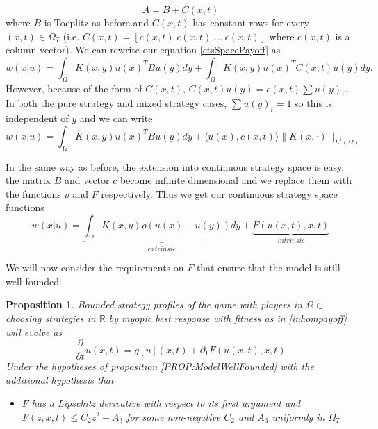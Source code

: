 \documentclass[aps,
preprint,
groupedaddress,
showkeys,
amsmath]{revtex4-2}
\newtheorem{proposition}{Proposition}
\DeclareMathOperator{\Rn}{\mathbb{R}^n}
\begin{document}
   \[A=B+C(x,t)\] 
    where $B$ is Toeplitz as before and $C(x,t)$ has constant rows for every $(x,t)\in \Omega_T$ (i.e. $C(x,t)=[c(x,t)\;c(x,t)\;\dots \;c(x,t)]$ where $c(x,t)$ is a column vector). We can rewrite our equation \eqref{ctsSpacePayoff} as
    \begin{equation*}
        w(x|u)=\int_\Omega K(x,y)u(x)^TBu(y)dy+\int_\Omega K(x,y)u(x)^T C(x,t)u(y)dy.
    \end{equation*}
    However, because of the form of $C(x,t)$,  $C(x,t)u(y)=c(x,t)\sum u(y)_i$.  In both the pure strategy and mixed strategy cases, $\sum u(y)_i=1$ so this is independent of $y$ and we can write 
    \begin{equation*}
        w(x|u)=\int_\Omega K(x,y)u(x)^TBu(y)dy+\langle u(x), c(x,t)\rangle \|K(x,\cdot)\|_{L^1(\Omega)}
    \end{equation*}

    In the same way as before, the extension into continuous strategy space is easy. the matrix $B$ and vector $c$ become infinite dimensional and we replace them with the functions $\rho$ and $F$ respectively. Thus we get our continuous strategy space functions
    \begin{equation}\label{inhompayoff}
        w(x|u)=\underbrace{\int_\Omega K(x,y)\rho(u(x)-u(y))dy}_{extrinsic}+ \underbrace{F(u(x,t),x,t)}_{intrinsic}
    \end{equation}

    We will now consider the requirements on $F$ that ensure that the model is still well founded. 

    \begin{proposition}\label{PROP:InhomogeneousModelWellFounded}
        Bounded strategy profiles of the game with players in $\Omega \subset \Rn$ choosing strategies in $\mathbb{R}$ by myopic best response with fitness as in \eqref{inhompayoff} will evolve as
        \begin{equation*}
            \frac{\partial}{\partial t}u(x,t)=g[u](x,t)+\partial_1 F(u(x,t),x,t)
        \end{equation*}
        Under the hypotheses of proposition \ref{PROP:ModelWellFounded} with the additional hypothesis that
        \begin{itemize}
            \item[(H4)] $F$ has a Lipschitz derivative with respect to its first argument and $F(z,x,t)\leq C_2z^2+A_3$ for some non-negative $C_2$ and $A_3$ uniformly in $\Omega_T$
        \end{itemize}
    \end{proposition}
\end{document}
